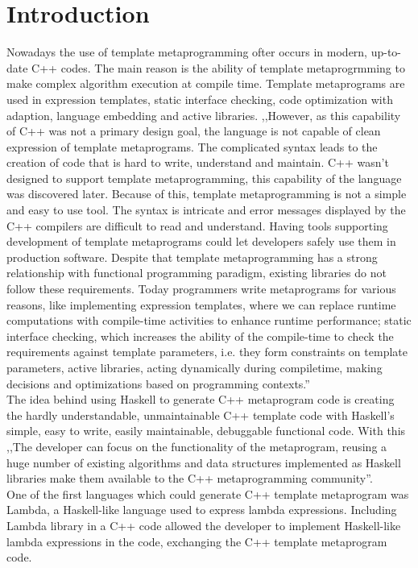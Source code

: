 \documentclass{article}
\begin{document}
\section{Introduction}
Nowadays the use of template metaprogramming ofter occurs in modern, up-to-date C++ codes. The main reason is the ability of template metaprogrmming to make complex algorithm execution at compile time. Template metaprograms are used in expression templates, static interface checking, code optimization with adaption, language embedding and active libraries. ,,However, as this capability of C++ was not a primary design goal, the
language is not capable of clean expression of template metaprograms. The complicated syntax leads to the creation of code that
is hard to write, understand and maintain. C++ wasn’t designed to support template
metaprogramming, this capability of the language was discovered
later. Because of this, template metaprogramming is not a simple
and easy to use tool. The syntax is intricate and error messages
displayed by the C++ compilers are difficult to read and understand.
Having tools supporting development of template metaprograms
could let developers safely use them in production software. Despite that template
metaprogramming has a strong relationship with functional programming paradigm, existing libraries do not follow these requirements. Today programmers write metaprograms for various reasons,
like implementing expression templates, where we can replace
runtime computations with compile-time activities to enhance runtime performance; static interface checking, which increases the
ability of the compile-time to check the requirements against template parameters, i.e. they form constraints on template parameters, active libraries, acting dynamically during compiletime, making decisions and optimizations based on programming
contexts.'' \cite{porkolab2009c++}  \\
The idea behind using Haskell to generate C++ metaprogram code is creating the hardly understandable, unmaintainable C++ template code with Haskell's simple, easy to write, easily maintainable, debuggable functional code. With this ,,The developer can focus on the
functionality of the metaprogram, reusing a huge number of existing algorithms
and data structures implemented as Haskell libraries make them available to the
C++ metaprogramming community''. \cite{porkolab2009functional}  \\
One of the first languages which could generate C++ template metaprogram was Lambda, a Haskell-like language used to express lambda expressions. Including Lambda library in a C++ code allowed the developer to implement Haskell-like lambda expressions in the code, exchanging the C++ template metaprogram code.
\end{document}
